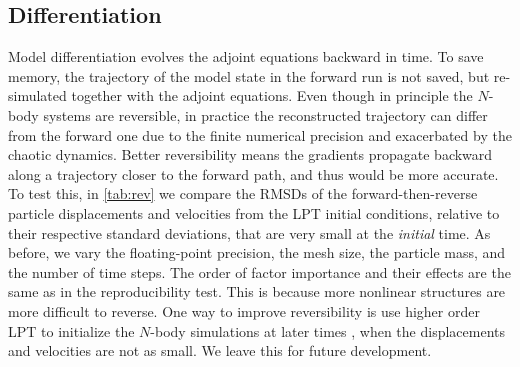 \documentclass[modern, dvipsnames]{aastex631}
\begin{document}
\vspace{1em}
\subsection{Differentiation}

Model differentiation evolves the adjoint equations backward in time.
To save memory, the trajectory of the model state in the forward run is
not saved, but re-simulated together with the adjoint equations.
Even though in principle the $N$-body systems are reversible, in
practice the reconstructed trajectory can differ from the forward one
due to the finite numerical precision and exacerbated by the chaotic
dynamics.
Better reversibility means the gradients propagate backward along a
trajectory closer to the forward path, and thus would be more accurate.
To test this, in \autoref{tab:rev} we compare the RMSDs of the
forward-then-reverse particle displacements and velocities from the LPT
initial conditions, relative to their respective standard deviations,
that are very small at the \emph{initial} time.
As before, we vary the floating-point precision, the mesh size, the
particle mass, and the number of time steps.
The order of factor importance and their effects are the same as in the
reproducibility test.
This is because more nonlinear structures are more difficult to reverse.
One way to improve reversibility is use higher order LPT to initialize
the $N$-body simulations at later times \citep{MichauxEtAl2021}, when
the displacements and velocities are not as small.
We leave this for future development.
\end{document}
